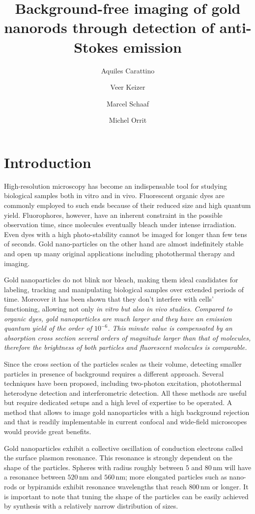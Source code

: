 \documentclass[journal=nalefd,manuscript=letter]{achemso}
\author{Aquiles Carattino}
\affiliation[Leiden]
{Huygens-Kamerlingh Onnes, Leiden, The Netherlands}
\author{Veer Keizer}
\affiliation[Leiden]
{Huygens-Kamerlingh Onnes, Leiden, The Netherlands}
\author{Marcel Schaaf}
\affiliation[Leiden]
{Huygens-Kamerlingh Onnes, Leiden, The Netherlands}
\author{Michel Orrit}
\affiliation[Leiden]
{Huygens-Kamerlingh Onnes Lab, 2300RA Leiden, The Netherlands}
\title{Background-free imaging of gold nanorods through detection of
anti-Stokes emission}
\newcommand{\nm}{\ensuremath{\,\textrm{nm}}}
\begin{document}
\maketitle
{}
\section{Introduction}
High-resolution microscopy has become an indispensable tool for studying
biological samples both in vitro and in vivo\cite{Moerner2007}.
Fluorescent organic dyes are commonly employed to such ends because of their
reduced size and high quantum yield. Fluorophores, however, have an inherent
constraint  in the possible observation time, since molecules eventually bleach
under intense irradiation. Even dyes with a high photo-stability cannot be imaged for
longer than few tens of seconds. Gold nano-particles on the other hand are
almost indefinitely stable and open up many original applications including
photothermal therapy and imaging.

Gold nanoparticles do not blink nor bleach, making them ideal candidates for 
labeling, tracking and manipulating biological samples over extended periods of
time. Moreover it has been shown that they don't interfere with cells'
functioning\cite{Lewinski2008}, allowing not only \em{in vitro} but also \em{in
vivo} studies. Compared to organic dyes, gold nanoparticles are much larger and
they have an emission quantum yield of the order of $10^{-6}$. This minute value
is compensated by an absorption cross section several orders of magnitude larger
than that of molecules, therefore the brightness of both particles and
fluorescent molecules is comparable.

Since the cross section of the particles scales as their volume, detecting
smaller particles in presence of background requires a different approach.
Several techniques have been proposed, including two-photon
excitation\cite{VandenBroek2013}, photothermal heterodyne
detection\cite{Berciaud2006} and interferometric detection\cite{Ignatovich2006}.
All these methods are useful but require dedicated setups and a high level of
expertise to be operated. A method that allows to image gold nanoparticles with
a high background rejection and that is readily implementable in current
confocal and wide-field microscopes would provide great benefits.

Gold nanoparticles exhibit a collective oscillation of conduction electrons
called the surface plasmon resonance. This resonance is strongly dependent on
the shape of the particles. Spheres with radius roughly between $5$ and $80\nm$
will have a resonance between $520\nm$ and $560\nm$; more elongated particles
such as nano-rods or bypiramids exhibit resonance wavelengths that reach
$800\nm$ or longer. It is important to note that tuning the shape of the particles can be
easily achieved by synthesis with a relatively narrow distribution of sizes.
\end{document}
